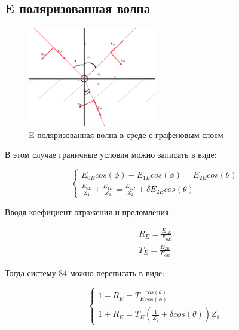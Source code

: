 	
	\subsection{E поляризованная волна}
	
	\begin{figure}[h] %
		\centering %
		\includegraphics[width=0.5\textwidth]{Рис 8.PNG} %
		\caption{E поляризованная волна в среде с графеновым слоем} %
		\label{fig:example8} %
	\end{figure}
	
	В этом случае граничные условия можно записать в виде:
	
	\begin{equation}
		\begin{cases}
			E_{0E} cos(\phi) - E_{1E} cos(\phi) = E_{2E} cos(\theta) \\
			\frac{E_{0E}}{Z_1} + \frac{E_{1E}}{Z_1} = \frac{E_{2H}}{Z_2} + \delta E_{2E} cos(\theta)
		\end{cases}
	\end{equation} 
	
	Вводя коефициент отражения и преломления:
	
	\begin{equation}
		\begin{aligned}
			R_E = \frac{E_{1E}}{E_{0E}} \\
			T_E = \frac{E_{2E}}{E_{0E}}
		\end{aligned}
	\end{equation}
	
	Тогда систему 84 можно переписать в виде:
	
	\begin{equation}
		\begin{cases}
			1 - R_E = T_E \frac{cos(\theta)}{cos(\phi)} \\
			1 + R_E = T_E (\frac{1}{Z_2} + \delta cos(\theta))Z_1
		\end{cases}
	\end{equation}
	
